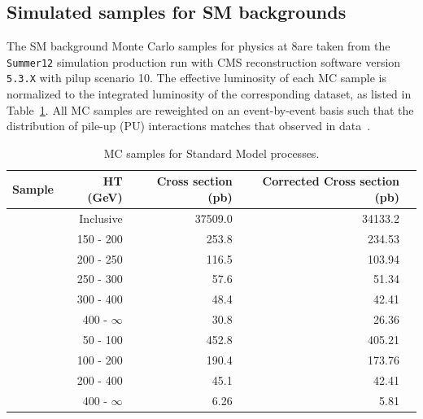 \subsection{Simulated samples for SM backgrounds\label{sec:mc-samples}}

The SM background Monte Carlo samples for physics at 8\TeV are taken
from the \verb!Summer12! simulation production run with CMS reconstruction
software version \verb!5.3.X! with pilup scenario 10. The effective
luminosity of each MC sample is normalized to the integrated
luminosity of the corresponding dataset, as listed in
Table~\ref{tab:mc-sm}.  All MC samples are reweighted on an 
event-by-event basis such that the distribution of pile-up (PU) 
interactions matches that observed in data~\cite{pu-reweight}.

\begin{center}
  \begin{table}[h]
    \caption{MC samples for Standard Model processes.}
    \label{tab:mc-sm}
    \centering
    \tiny
    \begin{tabular}{ lrrrr }
      \hline
      Sample & HT (GeV) & Cross section (pb) & Corrected Cross section (pb) \\%
      \hline
      \hline
      \wlnu  		& Inclusive         & 37509.0 & 34133.2  \\   %
      \wlnu  		& 150 - 200         & 253.8   & 234.53   \\   %
      \wlnu  		& 200 - 250         & 116.5   & 103.94   \\   %
      \wlnu  		& 250 - 300         & 57.6    & 51.34    \\   %
      \wlnu  		& 300 - 400         & 48.4    & 42.41    \\   %
      \wlnu  		& 400 - $\infty$    & 30.8    & 26.36    \\   %
      \znunu 		& 50 - 100          & 452.8   & 405.21   \\   %
      \znunu 		& 100 - 200         & 190.4   & 173.76   \\   %
      \znunu 		& 200 - 400         & 45.1    & 42.41    \\   %
      \znunu 		& 400 - $\infty$    & 6.26    & 5.81     \\   %

\end{tabular}
\end{table}
\end{center}
